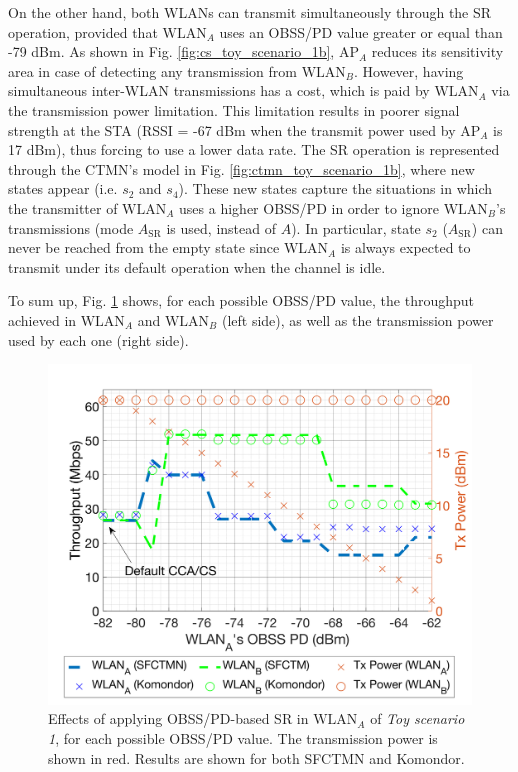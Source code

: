 \documentclass[comsoc]{IEEEtran}
\begin{document}
	On the other hand, both WLANs can transmit simultaneously through the SR operation, provided that $\text{WLAN}_A$ uses an OBSS/PD value greater or equal than -79 dBm. As shown in Fig. \ref{fig:cs_toy_scenario_1b}, $\text{AP}_A$ reduces its sensitivity area in case of detecting any transmission from $\text{WLAN}_B$. However, having simultaneous inter-WLAN transmissions has a cost, which is paid by $\text{WLAN}_A$ via the transmission power limitation. This limitation results in poorer signal strength at the STA (RSSI = -67 dBm when the transmit power used by AP$_A$ is 17 dBm), thus forcing to use a lower data rate. The SR operation is represented through the CTMN's model in Fig. \ref{fig:ctmn_toy_scenario_1b}, where new states appear (i.e. $s_2$ and $s_4$). These new states capture the situations in which the transmitter of $\text{WLAN}_A$ uses a higher OBSS/PD in order to ignore $\text{WLAN}_B$'s transmissions (mode $A_\text{SR}$ is used, instead of $A$). In particular, state $s_2$ ($A_\text{SR}$) can never be reached from the empty state since $\text{WLAN}_A$ is always expected to transmit under its default operation when the channel is idle.
	
	To sum up, Fig. \ref{fig:toy_scenario_1_results} shows, for each possible OBSS/PD value, the throughput achieved in $\text{WLAN}_A$ and $\text{WLAN}_B$ (left side), as well as the transmission power used by each one (right side).  
	\begin{figure}[ht!]
		\centering
		\includegraphics[width=\columnwidth]{SIM_1_1}
		\caption{Effects of applying OBSS/PD-based SR in $\text{WLAN}_A$ of \emph{Toy scenario 1}, for each possible OBSS/PD value. The transmission power is shown in red. Results are shown for both SFCTMN and Komondor.}		\label{fig:toy_scenario_1_results}
	\end{figure}
	
\end{document}
